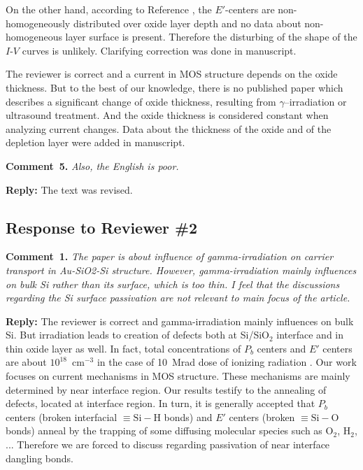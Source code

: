 \documentclass[aip,jap,preprint]{revtex4-1}
\begin{document}
On the other hand, according to Reference \cite{PersenkovBook},
the $E'$-centers are non-homogeneously distributed over oxide layer depth
and no data about non-homogeneous layer surface is present.
Therefore the disturbing of the shape of the $I$-$V$ curves is unlikely.
Clarifying correction was done in manuscript.


The reviewer is correct and a current in MOS structure depends on the oxide thickness.
But to the best of our knowledge, there is no published paper which describes a significant change
of oxide thickness, resulting from $\gamma$--irradiation or ultrasound treatment.
And the oxide thickness is considered constant when analyzing current changes.
Data about the thickness of the oxide and of the depletion layer were added in manuscript.




\noindent
\textcolor[rgb]{0.00,0.50,1.00}{\textbf{Comment~5.}}
\emph{Also, the English is poor.}


\noindent
\textcolor[rgb]{0.51,0.00,0.00}{\textbf{Reply:}}
The text was revised.


\subsection*{Response to Reviewer \#2 }

\noindent
\textcolor[rgb]{0.00,0.50,1.00}{\textbf{Comment~1.}}
\emph{ The paper is about influence of gamma-irradiation on carrier transport in Au-SiO2-Si structure. However, gamma-irradiation mainly influences on bulk Si rather than its surface, which is too thin. I feel that the discussions regarding the Si surface passivation are not relevant to main focus of the article.}

\noindent
\textcolor[rgb]{0.51,0.00,0.00}{\textbf{Reply:}}
The reviewer is correct and gamma-irradiation mainly influences on bulk Si.
But irradiation leads to creation of defects both at Si/SiO$_2$  interface and in thin oxide layer as well.
In fact, total concentrations of $P_b$ centers and $E'$ centers are about $10^{18}$~cm$^{-3}$
in the case of 10~Mrad dose of ionizing radiation \cite{Fleetwood,PersenkovBook}.
Our work focuses on current mechanisms in MOS structure.
These mechanisms are mainly determined by near interface region.
Our results testify to the annealing  of defects, located at interface region.
In turn, it  is generally accepted \cite{SiO2:Devine,SiO2:Mahapatra} that $P_b$ centers (broken interfacial $\equiv\!\mathrm{Si}\!-\!\mathrm{H}$ bonds) and $E'$ centers (broken $\equiv\!\mathrm{Si}\!-\!\mathrm{O}$ bonds) anneal by  the
trapping  of  some  diffusing molecular species  such as  $\text{O}_2$, $\text{H}_2$, ...
Therefore we are forced to discuss regarding passivation of near interface dangling bonds.
\end{document}
